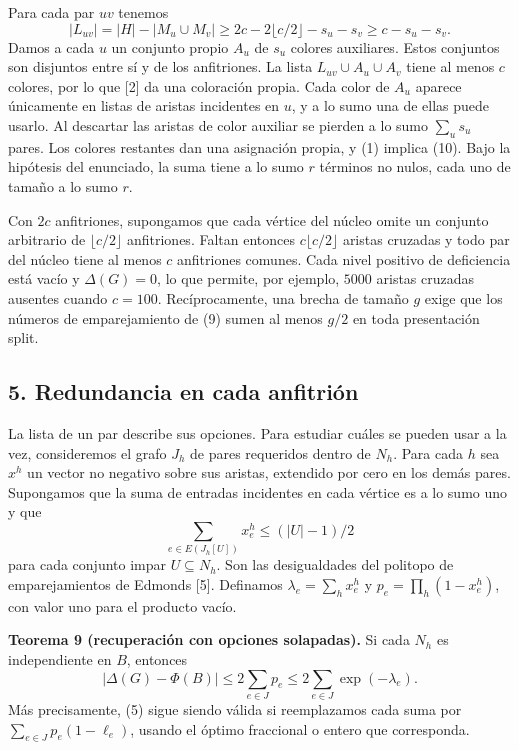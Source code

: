 \documentclass[spanish,11pt,a4paper]{article}
\begin{document}
Para cada par \(uv\) tenemos \[
|L_{uv}|=|H|-|M_u\cup M_v|\ge 2c-2\lfloor c/2\rfloor-s_u-s_v\ge c-s_u-s_v .
\] Damos a cada \(u\) un conjunto propio \(A_u\) de \(s_u\) colores auxiliares. Estos conjuntos son disjuntos entre sí y de los anfitriones. La lista \(L_{uv}\cup A_u\cup A_v\) tiene al menos \(c\) colores, por lo que {[}2{]} da una coloración propia. Cada color de \(A_u\) aparece únicamente en listas de aristas incidentes en \(u\), y a lo sumo una de ellas puede usarlo. Al descartar las aristas de color auxiliar se pierden a lo sumo \(\sum_u s_u\) pares. Los colores restantes dan una asignación propia, y (1) implica (10). Bajo la hipótesis del enunciado, la suma tiene a lo sumo \(r\) términos no nulos, cada uno de tamaño a lo sumo \(r\).

Con \(2c\) anfitriones, supongamos que cada vértice del núcleo omite un conjunto arbitrario de \(\lfloor c/2\rfloor\) anfitriones. Faltan entonces \(c\lfloor c/2\rfloor\) aristas cruzadas y todo par del núcleo tiene al menos \(c\) anfitriones comunes. Cada nivel positivo de deficiencia está vacío y \(\Delta(G)=0\), lo que permite, por ejemplo, \(5000\) aristas cruzadas ausentes cuando \(c=100\). Recíprocamente, una brecha de tamaño \(g\) exige que los números de emparejamiento de (9) sumen al menos \(g/2\) en toda presentación split.

\subsection{5. Redundancia en cada anfitrión}\label{redundancia-en-cada-anfitriuxf3n}

La lista de un par describe sus opciones. Para estudiar cuáles se pueden usar a la vez, consideremos el grafo \(J_h\) de pares requeridos dentro de \(N_h\). Para cada \(h\) sea \(x^h\) un vector no negativo sobre sus aristas, extendido por cero en los demás pares. Supongamos que la suma de entradas incidentes en cada vértice es a lo sumo uno y que \[
\sum_{e\in E(J_h[U])}x^h_e\le (|U|-1)/2
\] para cada conjunto impar \(U\subseteq N_h\). Son las desigualdades del politopo de emparejamientos de Edmonds {[}5{]}. Definamos \(\lambda_e=\sum_h x^h_e\) y \(p_e=\prod_h(1-x^h_e)\), con valor uno para el producto vacío.

\textbf{Teorema 9 (recuperación con opciones solapadas).} Si cada \(N_h\) es independiente en \(B\), entonces \[
|\Delta(G)-\Phi(B)|\le 2\sum_{e\in J}p_e
                  \le 2\sum_{e\in J}\exp(-\lambda_e). \tag{11}
\] Más precisamente, (5) sigue siendo válida si reemplazamos cada suma por \(\sum_{e\in J}p_e(1-\ell_e)\), usando el óptimo fraccional o entero que corresponda.
\end{document}
